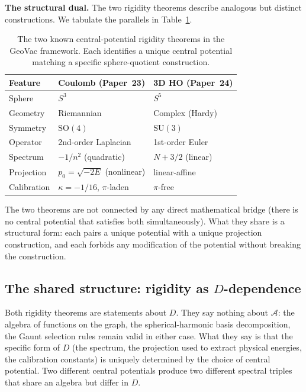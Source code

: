 \documentclass[twocolumn,pra,amsmath,amssymb,superscriptaddress]{revtex4-2}
\begin{document}
\medskip\noindent\textbf{The structural dual.}  The two rigidity
theorems describe analogous but distinct constructions.  We tabulate
the parallels in Table~\ref{tab:rigidity_dual}.

\begin{table}[h]
\caption{The two known central-potential rigidity theorems in the
GeoVac framework.  Each identifies a unique central potential
matching a specific sphere-quotient construction.}
\label{tab:rigidity_dual}
\begin{ruledtabular}
\begin{tabular}{lll}
Feature & Coulomb (Paper~23) & 3D HO (Paper~24) \\
\hline
Sphere & $S^3$ & $S^5$ \\
Geometry & Riemannian & Complex (Hardy) \\
Symmetry & $\mathrm{SO}(4)$ & $\mathrm{SU}(3)$ \\
Operator & 2nd-order Laplacian & 1st-order Euler \\
Spectrum & $-1/n^2$ (quadratic) & $N + 3/2$ (linear) \\
Projection & $p_0 = \sqrt{-2E}$ (nonlinear) & linear-affine \\
Calibration & $\kappa = -1/16$, $\pi$-laden & $\pi$-free \\
\end{tabular}
\end{ruledtabular}
\end{table}

The two theorems are not connected by any direct mathematical bridge
(there is no central potential that satisfies both simultaneously).
What they share is a structural form: each pairs a unique potential
with a unique projection construction, and each forbids any
modification of the potential without breaking the construction.

\subsection{The shared structure: rigidity as $D$-dependence}

Both rigidity theorems are statements about $D$.  They say nothing
about $\mathcal{A}$: the algebra of functions on the graph, the
spherical-harmonic basis decomposition, the Gaunt selection rules
remain valid in either case.  What they say is that the specific form
of $D$ (the spectrum, the projection used to extract physical
energies, the calibration constants) is uniquely determined by the
choice of central potential.  Two different central potentials
produce two different spectral triples that share an algebra but
differ in $D$.
\end{document}
